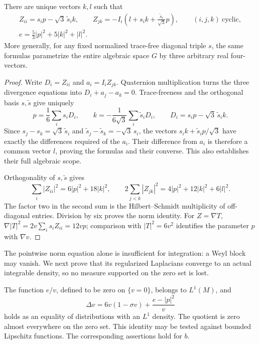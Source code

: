 \begin{lemma}
\label{lem:gradient-parametrization}
There are unique vectors $k,l$ such that
\begin{equation}
 \begin{gathered}
 Z_{ii}=s_i p-\sqrt3\,\widetilde s_i k,\qquad
 Z_{jk}=-I_i\left(l+s_i k+\frac{\widetilde s_i}{\sqrt3}p\right),
 \qquad (i,j,k)\ \text{cyclic},\\
 e=\frac53|p|^2+5|k|^2+|l|^2.
 \end{gathered}
 \tag{2}\label{eq:2}
\end{equation}
More generally, for any fixed normalized trace-free diagonal triple
$s$, the same formulas parametrize the entire algebraic space $G$
by three arbitrary real four-vectors.
\end{lemma}

\begin{proof}
Write $D_i=Z_{ii}$ and $a_i=I_iZ_{jk}$. Quaternion multiplication
turns the three divergence equations into
$D_i+a_j-a_k=0$. Trace-freeness and the orthogonal basis
$s,\widetilde s$ give uniquely
\[
 p=\frac16\sum_i s_iD_i,\qquad
 k=-\frac1{6\sqrt3}\sum_i\widetilde s_iD_i,\qquad
 D_i=s_ip-\sqrt3\,\widetilde s_i k.
\]
Since
$s_j-s_k=\sqrt3\,\widetilde s_i$ and
$\widetilde s_j-\widetilde s_k=-\sqrt3\,s_i$,
the vectors $s_i k+\widetilde s_i p/\sqrt3$ have exactly the
differences required of the $a_i$. Their difference from $a_i$ is
therefore a common vector $l$, proving the formulas and their
converse. This also establishes their full algebraic scope.

Orthogonality of $s,\widetilde s$ gives
\[
 \sum_i|Z_{ii}|^2=6|p|^2+18|k|^2,\qquad
 2\sum_{j<k}|Z_{jk}|^2=4|p|^2+12|k|^2+6|l|^2.
\]
The factor two in the second sum is the Hilbert--Schmidt multiplicity
of off-diagonal entries. Division by six proves the norm identity.
For $Z=\nabla T$,
$\nabla|T|^2=2v\sum_i s_iZ_{ii}=12vp$; comparison with
$|T|^2=6v^2$ identifies the parameter $p$ with $\nabla v$.
\end{proof}

The pointwise norm equation alone is insufficient for integration:
a Weyl block may vanish. We next prove that its regularized Laplacians
converge to an actual integrable density, so no measure supported on the
zero set is lost.

\begin{proposition}
\label{prop:weak-norm-equation}
The function $e/v$, defined to be zero on $\{v=0\}$, belongs to
$L^1(M)$, and
\begin{equation}
 \Delta v=6v(1-\sigma v)+\frac{e-|p|^2}{v}
 \tag{3}\label{eq:3}
\end{equation}
holds as an equality of distributions with an $L^1$ density.
The quotient is zero almost everywhere on the zero set.
This identity may be tested against bounded Lipschitz functions.
The corresponding assertions hold for $b$.
\end{proposition}

